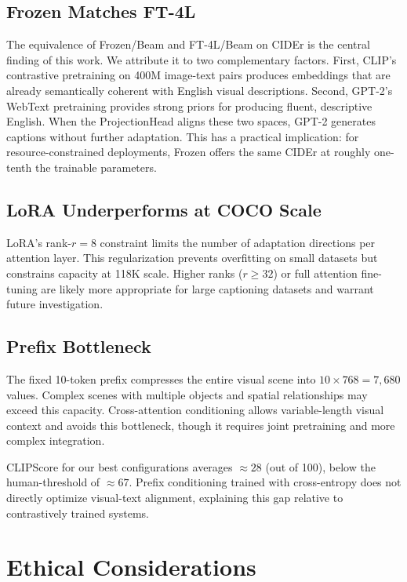 \documentclass[conference]{IEEEtran}
\begin{document}
\subsection{Frozen Matches FT-4L}

The equivalence of Frozen/Beam and FT-4L/Beam on CIDEr is the central finding of this work. We attribute it to two complementary factors. First, CLIP's contrastive pretraining on 400M image-text pairs produces embeddings that are already semantically coherent with English visual descriptions. Second, GPT-2's WebText pretraining provides strong priors for producing fluent, descriptive English. When the ProjectionHead aligns these two spaces, GPT-2 generates captions without further adaptation. This has a practical implication: for resource-constrained deployments, Frozen offers the same CIDEr at roughly one-tenth the trainable parameters.

\subsection{LoRA Underperforms at COCO Scale}

LoRA's rank-$r=8$ constraint limits the number of adaptation directions per attention layer. This regularization prevents overfitting on small datasets but constrains capacity at 118K scale. Higher ranks ($r \geq 32$) or full attention fine-tuning are likely more appropriate for large captioning datasets and warrant future investigation.

\subsection{Prefix Bottleneck}

The fixed 10-token prefix compresses the entire visual scene into $10 \times 768 = 7{,}680$ values. Complex scenes with multiple objects and spatial relationships may exceed this capacity. Cross-attention conditioning \cite{alayrac2022flamingo} allows variable-length visual context and avoids this bottleneck, though it requires joint pretraining and more complex integration.

CLIPScore for our best configurations averages $\approx28$ (out of 100), below the human-threshold of $\approx67$. Prefix conditioning trained with cross-entropy does not directly optimize visual-text alignment, explaining this gap relative to contrastively trained systems.

\section{Ethical Considerations}
\end{document}
